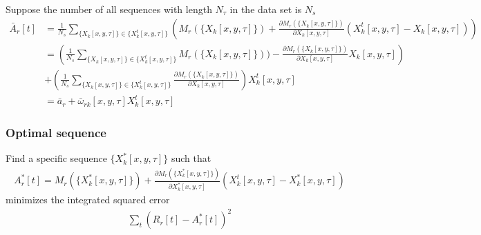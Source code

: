 \documentclass[10pt,a4paper]{article}
\newcommand{\del}[2]{\frac{\partial #1}{\partial #2}}
\begin{document}
Suppose the number of all sequences with length $N_\tau$ in the data set is $N_s$
\begin{align}
\bar{A}_r[t] & = \frac{1}{N_s}\sum_{\{X_k[x,y,\tau]\} \in \{X^t_k[x,y,\tau]\}} \left( M_r(\{X_k[x,y,\tau]\}) + \del{ M_r(\{X_k[x,y,\tau]\})}{X_k[x,y,\tau]}(X^t_k[x,y,\tau]-X_k[x,y,\tau]) \right) \\
& = \left(  \frac{1}{N_s}\sum_{\{X_k[x,y,\tau]\} \in \{X^t_k[x,y,\tau]\}} M_r(\{X_k[x,y,\tau]\})) - \del{ M_r(\{X_k[x,y,\tau]\})}{X_k[x,y,\tau]}X_k[x,y,\tau] \right) \\
& + \left( \frac{1}{N_s} \sum_{\{X_k[x,y,\tau]\} \in \{X^t_k[x,y,\tau]\}} \del{ M_r(\{X_k[x,y,\tau]\})}{X_k[x,y,\tau]} \right) X^t_k[x,y,\tau] \\
& = \bar{a}_r + \bar{\omega}_{rk}[x,y,\tau] X^t_k[x,y,\tau] 
\end{align}

\subsubsection{Optimal sequence}

Find a specific sequence $\{X^*_k[x,y,\tau]\}$ such that
\begin{align}
{A}^*_r[t] = M_r(\{X^*_k[x,y,\tau]\}) + \del{ M_r(\{X^*_k[x,y,\tau]\})}{X^*_k[x,y,\tau]}(X^t_k[x,y,\tau]-X^*_k[x,y,\tau])
\end{align}
minimizes the integrated squared error
\begin{align}
\sum_t (R_r[t]-{A}^*_r[t])^2
\end{align}
\end{document}
